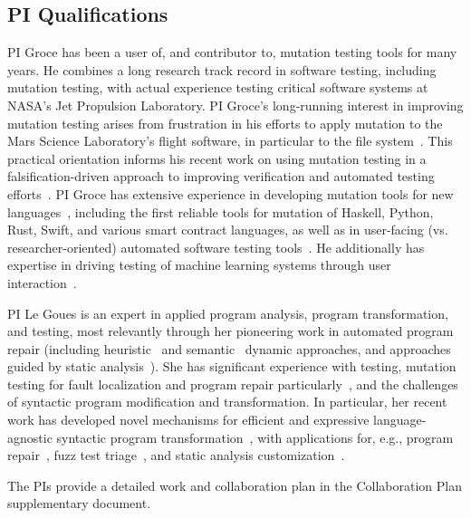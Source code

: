 

\subsection{PI Qualifications}

PI Groce has been a user of, and contributor to, mutation testing tools for many
years.  He combines a long research track record in software testing, including
mutation testing, with actual experience testing critical software systems at
NASA's Jet Propulsion Laboratory.  PI Groce's long-running interest in improving
mutation testing arises from frustration in his efforts to apply mutation to the
Mars Science Laboratory's flight software, in particular to the file
system~\cite{ICSEDiff,CFV08,AMAI}.  This practical orientation informs his
recent work on using mutation testing in a falsification-driven approach to
improving verification and automated testing
efforts~\cite{groce2015verified,groce2018verified,mutKernel}.  PI Groce has
extensive experience in developing mutation tools for new
languages~\cite{le2014mucheck,muupi,regexpMut}, including the first reliable
tools for mutation of Haskell, Python, Rust, Swift, and various smart
contract languages, as well as in user-facing
(vs. researcher-oriented) automated software testing
tools~\cite{tstlsttt,DeepState}.  He additionally has expertise in driving
testing of machine learning systems through user
interaction~\cite{EndUserMistake,OnlyOracle}.

PI Le Goues is an expert in applied program analysis, program transformation,
and testing, most relevantly through her pioneering work in automated program
repair (including heuristic~\cite{legouesNFWTSE2012} and
semantic~\cite{s3,Ke15ase} dynamic approaches, and approaches guided by
static analysis~\cite{footpatch}).  She has significant experience
with testing, mutation testing for fault localization and program repair
particularly~\cite{ssbse}, and the challenges of syntactic program
modification and transformation.  In particular, her recent work has developed
novel mechanisms for efficient and expressive language-agnostic syntactic
program transformation~\cite{rvt-ppc}, with applications for, e.g., program
repair~\cite{footpatch}, fuzz test triage~\cite{vantonder-ase18}, and static analysis
customization~\cite{vanTonder-tailoring20}.

The PIs provide a detailed work and collaboration plan in the Collaboration Plan
supplementary document.
